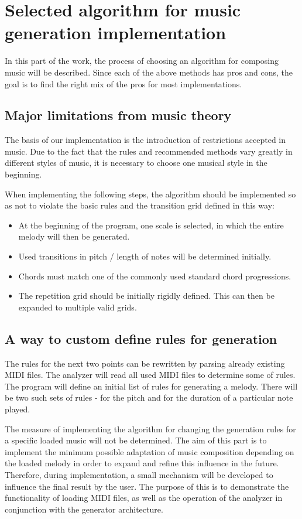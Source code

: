 \documentclass[thesis=B,english]{FITthesis}[2019/12/23]
\begin{document}
\section{Selected algorithm for music generation implementation}

In this part of the work, the process of choosing an algorithm for composing music will be described. Since each of the above methods has pros and cons, the goal is to find the right mix of the pros for most implementations.

\subsection{Major limitations from music theory}

The basis of our implementation is the introduction of restrictions accepted in music. Due to the fact that the rules and recommended methods vary greatly in different styles of music, it is necessary to choose one musical style in the beginning.

When implementing the following steps, the algorithm should be implemented so as not to violate the basic rules and the transition grid defined in this way:
\begin{itemize}
    \item At the beginning of the program, one scale is selected, in which the entire melody will then be generated.
    \item Used transitions in pitch / length of notes will be determined initially.
    \item Chords must match one of the commonly used standard chord progressions.
    \item The repetition grid should be initially rigidly defined. This can then be expanded to multiple valid grids.
\end{itemize}

\subsection{A way to custom define rules for generation}

The rules for the next two points can be rewritten by parsing already existing MIDI files. The analyzer will read all used MIDI files to determine some of rules. The program will define an initial list of rules for generating a melody. There will be two such sets of rules - for the pitch and for the duration of a particular note played.

The measure of implementing the algorithm for changing the generation rules for a specific loaded music will not be determined. The aim of this part is to implement the minimum possible adaptation of music composition depending on the loaded melody in order to expand and refine this influence in the future. Therefore, during implementation, a small mechanism will be developed to influence the final result by the user. The purpose of this is to demonstrate the functionality of loading MIDI files, as well as the operation of the analyzer in conjunction with the generator architecture.
\end{document}
